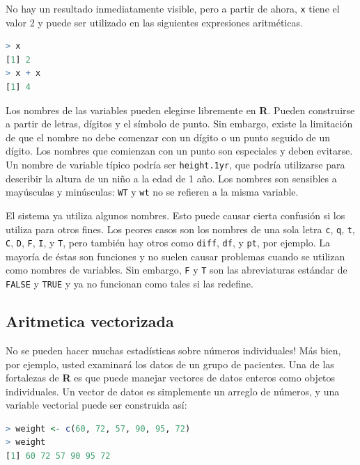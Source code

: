 \documentclass[spanish]{extbook}
\numberwithin{equation}{section}
\numberwithin{figure}{section}
\begin{document}
No hay un resultado inmediatamente visible, pero a partir de ahora,
\texttt{x} tiene el valor 2 y puede ser utilizado en las siguientes
expresiones aritméticas.

\begin{lstlisting}[language=R]
> x 
[1] 2 
> x + x 
[1] 4
\end{lstlisting}

Los nombres de las variables pueden elegirse libremente en \textbf{R}.  Pueden
construirse a partir de letras, dígitos y el símbolo de punto.  Sin embargo,
existe la limitación de que el nombre no debe comenzar con un dígito o un punto
seguido de un dígito. Los nombres que comienzan con un punto son especiales y
deben evitarse. Un nombre de variable típico podría ser \texttt{height.1yr},
que podría utilizarse para describir la altura de un niño a la edad de 1 año.
Los nombres son sensibles a mayúsculas y minúsculas: \texttt{WT} y \texttt{wt}
no se refieren a la misma variable.

El sistema ya utiliza algunos nombres. Esto puede causar cierta confusión si
los utiliza para otros fines. Los peores casos son los nombres de una sola
letra \texttt{c}, \texttt{q}, \texttt{t}, \texttt{C}, \texttt{D}, \texttt{F},
\texttt{I}, y \texttt{T}, pero también hay otros como \texttt{diff},
\texttt{df}, y \texttt{pt}, por ejemplo.  La mayoría de éstas son funciones y
no suelen causar problemas cuando se utilizan como nombres de variables. Sin
embargo, \texttt{F} y \texttt{T} son las abreviaturas estándar de
\texttt{FALSE} y \texttt{TRUE} y ya no funcionan como tales si las redefine.

\subsection{Aritmetica vectorizada}

No se pueden hacer muchas estadísticas sobre números individuales!  Más bien,
por ejemplo, usted examinará los datos de un grupo de pacientes.  Una de las
fortalezas de \textbf{R} es que puede manejar vectores de datos enteros como
objetos individuales.  Un vector de datos es simplemente un arreglo de números,
y una variable vectorial puede ser construida así:

\begin{lstlisting}[language=R]
> weight <- c(60, 72, 57, 90, 95, 72) 
> weight 
[1] 60 72 57 90 95 72
\end{lstlisting}
\end{document}
